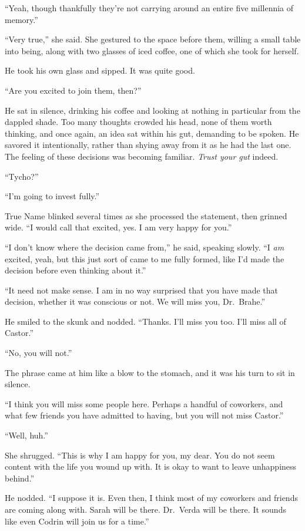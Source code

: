 ``Yeah, though thankfully they're not carrying around an entire five millennia of memory.''

``Very true,'' she said. She gestured to the space before them, willing a small table into being, along with two glasses of iced coffee, one of which she took for herself.

He took his own glass and sipped. It was quite good.

``Are you excited to join them, then?''

He sat in silence, drinking his coffee and looking at nothing in particular from the dappled shade. Too many thoughts crowded his head, none of them worth thinking, and once again, an idea sat within his gut, demanding to be spoken. He savored it intentionally, rather than shying away from it as he had the last one. The feeling of these decisions was becoming familiar. \emph{Trust your gut} indeed.

``Tycho?''

``I'm going to invest fully.''

True Name blinked several times as she processed the statement, then grinned wide. ``I would call that excited, yes. I am very happy for you.''

``I don't know where the decision came from,'' he said, speaking slowly. ``I \emph{am} excited, yeah, but this just sort of came to me fully formed, like I'd made the decision before even thinking about it.''

``It need not make sense. I am in no way surprised that you have made that decision, whether it was conscious or not. We will miss you, Dr.~Brahe.''

He smiled to the skunk and nodded. ``Thanks. I'll miss you too. I'll miss all of Castor.''

``No, you will not.''

The phrase came at him like a blow to the stomach, and it was his turn to sit in silence.

``I think you will miss some people here. Perhaps a handful of coworkers, and what few friends you have admitted to having, but you will not miss Castor.''

``Well, huh.''

She shrugged. ``This is why I am happy for you, my dear. You do not seem content with the life you wound up with. It is okay to want to leave unhappiness behind.''

He nodded. ``I suppose it is. Even then, I think most of my coworkers and friends are coming along with. Sarah will be there. Dr.~Verda will be there. It sounds like even Codrin will join us for a time.''

